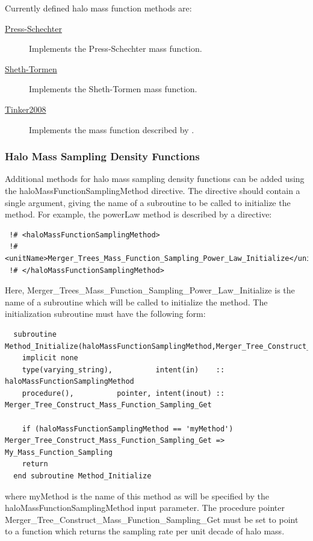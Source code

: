 Currently defined halo mass function methods are:
\begin{description}
 \item [\hyperlink{structure_formation.halo_mass_function.Press-Schechter.F90:halo_mass_function_press_schechter:halo_mass_function_differential_press_schechter}{{\normalfont \ttfamily Press-Schechter}}] Implements the Press-Schechter \citep{press_formation_1974} mass function.
 \item [\hyperlink{structure_formation.halo_mass_function.Sheth-Tormen.F90:halo_mass_function_sheth_tormen:halo_mass_function_sheth_tormen_differential}{{\normalfont \ttfamily Sheth-Tormen}}] Implements the Sheth-Tormen \citep{sheth_ellipsoidal_2001} mass function.
 \item [\hyperlink{structure_formation.halo_mass_function.Tinker2008.F90:halo_mass_function_tinker2008:halo_mass_function_differential_tinker2008}{{\normalfont \ttfamily Tinker2008}}] Implements the mass function described by \cite{tinker_towardhalo_2008}.
\end{description}

\subsubsection{Halo Mass Sampling Density Functions}

Additional methods for halo mass sampling density functions can be added using the {\normalfont \ttfamily haloMassFunctionSamplingMethod} directive. The directive should contain a single argument, giving the name of a subroutine to be called to initialize the method. For example, the {\normalfont \ttfamily powerLaw} method is described by a directive:
\begin{verbatim}
 !# <haloMassFunctionSamplingMethod>
 !#  <unitName>Merger_Trees_Mass_Function_Sampling_Power_Law_Initialize</unitName>
 !# </haloMassFunctionSamplingMethod>
\end{verbatim}
Here, {\normalfont \ttfamily Merger\_Trees\_Mass\_Function\_Sampling\_Power\_Law\_Initialize} is the name of a subroutine which will be called to initialize the method. The initialization subroutine must have the following form:
\begin{verbatim}
  subroutine Method_Initialize(haloMassFunctionSamplingMethod,Merger_Tree_Construct_Mass_Function_Sampling_Get)
    implicit none
    type(varying_string),          intent(in)    :: haloMassFunctionSamplingMethod
    procedure(),          pointer, intent(inout) :: Merger_Tree_Construct_Mass_Function_Sampling_Get
    
    if (haloMassFunctionSamplingMethod == 'myMethod') Merger_Tree_Construct_Mass_Function_Sampling_Get => My_Mass_Function_Sampling
    return
  end subroutine Method_Initialize
\end{verbatim}
where {\normalfont \ttfamily myMethod} is the name of this method as will be specified by the {\normalfont \ttfamily haloMassFunctionSamplingMethod} input parameter. The procedure pointer {\normalfont \ttfamily Merger\_Tree\_Construct\_Mass\_Function\_Sampling\_Get} must be set to point to a function which returns the sampling rate per unit decade of halo mass.

